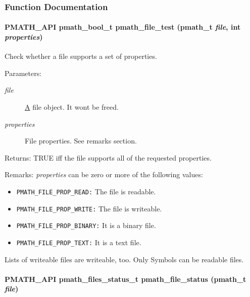 \subsubsection{Function Documentation}
\hypertarget{group__file__api_gacadb911c98d75248cbcf4fbe5a3237a}{
\paragraph[{pmath\_\-file\_\-test}]{\setlength{\rightskip}{0pt plus 5cm}PMATH\_\-API {\bf pmath\_\-bool\_\-t} pmath\_\-file\_\-test ({\bf pmath\_\-t} {\em file}, \/  int {\em properties})}\hfill}
\label{group__file__api_gacadb911c98d75248cbcf4fbe5a3237a}


Check whether a file supports a set of properties. 

\begin{Desc}
\item[Parameters:]
\begin{description}
\item[{\em file}]\hyperlink{class_a}{A} file object. It wont be freed. \item[{\em properties}]File properties. See remarks section. \end{description}
\end{Desc}
\begin{Desc}
\item[Returns:]TRUE iff the file supports all of the requested properties.\end{Desc}
\begin{Desc}
\item[Remarks:]{\em properties\/} can be zero or more of the following values: \begin{itemize}
\item {\tt PMATH\_\-FILE\_\-PROP\_\-READ:} The file is readable.

\item {\tt PMATH\_\-FILE\_\-PROP\_\-WRITE:} The file is writeable.

\item {\tt PMATH\_\-FILE\_\-PROP\_\-BINARY:} It is a binary file.

\item {\tt PMATH\_\-FILE\_\-PROP\_\-TEXT:} It is a text file. \end{itemize}
\end{Desc}
Lists of writeable files are writeable, too. Only Symbols can be readable files. \hypertarget{group__file__api_gc3e849245672e6b61ee1a447218d5ea5}{
\paragraph[{pmath\_\-file\_\-status}]{\setlength{\rightskip}{0pt plus 5cm}PMATH\_\-API {\bf pmath\_\-files\_\-status\_\-t} pmath\_\-file\_\-status ({\bf pmath\_\-t} {\em file})}\hfill}
\label{group__file__api_gc3e849245672e6b61ee1a447218d5ea5}


